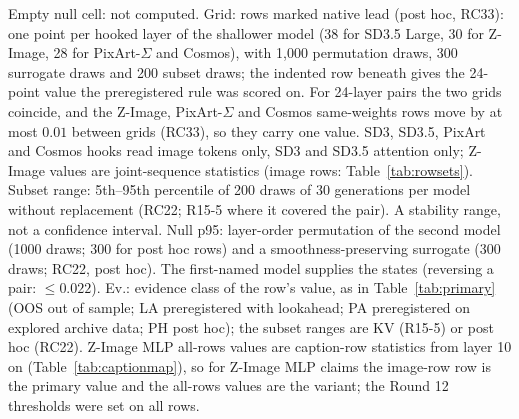 \documentclass[11pt]{article}
\begin{document}
\begin{table}[p]
\par\smallskip\raggedright\tiny Empty null cell: not computed. Grid: rows marked native lead (post hoc, RC33): one point per hooked layer of the shallower model (38 for SD3.5 Large, 30 for Z-Image, 28 for PixArt-$\Sigma$ and Cosmos), with 1{,}000 permutation draws, 300 surrogate draws and 200 subset draws; the indented row beneath gives the 24-point value the preregistered rule was scored on. For 24-layer pairs the two grids coincide, and the Z-Image, PixArt-$\Sigma$ and Cosmos same-weights rows move by at most $0.01$ between grids (RC33), so they carry one value. SD3, SD3.5, PixArt and Cosmos hooks read image tokens only, SD3 and SD3.5 attention only; Z-Image values are joint-sequence statistics (image rows: Table~\ref{tab:rowsets}). Subset range: 5th--95th percentile of 200 draws of 30 generations per model without replacement (RC22; R15-5 where it covered the pair). A stability range, not a confidence interval. Null p95: layer-order permutation of the second model (1000 draws; 300 for post hoc rows) and a smoothness-preserving surrogate (300 draws; RC22, post hoc). The first-named model supplies the states (reversing a pair: $\le0.022$). Ev.: evidence class of the row's value, as in Table~\ref{tab:primary} (OOS out of sample; LA preregistered with lookahead; PA preregistered on explored archive data; PH post hoc); the subset ranges are KV (R15-5) or post hoc (RC22). Z-Image MLP all-rows values are caption-row statistics from layer 10 on (Table~\ref{tab:captionmap}), so for Z-Image MLP claims the image-row row is the primary value and the all-rows values are the variant; the Round 12 thresholds were set on all rows.
\end{table}
\end{document}
